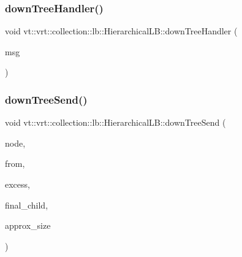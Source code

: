 \mbox{\label{structvt_1_1vrt_1_1collection_1_1lb_1_1_hierarchical_l_b_aa5e027cba0dfc9a1c7bc710e9932647a}} 
\subsubsection{\texorpdfstring{down\+Tree\+Handler()}{downTreeHandler()}}
{\footnotesize\ttfamily void vt\+::vrt\+::collection\+::lb\+::\+Hierarchical\+L\+B\+::down\+Tree\+Handler (\begin{DoxyParamCaption}\item[{\hyperlink{structvt_1_1vrt_1_1collection_1_1lb_1_1_l_b_tree_down_msg}{L\+B\+Tree\+Down\+Msg} $\ast$}]{msg }\end{DoxyParamCaption})\hspace{0.3cm}{\ttfamily [private]}}

\mbox{\label{structvt_1_1vrt_1_1collection_1_1lb_1_1_hierarchical_l_b_aff832357cbb81dc17578c9f8876b7ecf}} 
\subsubsection{\texorpdfstring{down\+Tree\+Send()}{downTreeSend()}}
{\footnotesize\ttfamily void vt\+::vrt\+::collection\+::lb\+::\+Hierarchical\+L\+B\+::down\+Tree\+Send (\begin{DoxyParamCaption}\item[{\hyperlink{namespacevt_a866da9d0efc19c0a1ce79e9e492f47e2}{Node\+Type} const}]{node,  }\item[{\hyperlink{namespacevt_a866da9d0efc19c0a1ce79e9e492f47e2}{Node\+Type} const}]{from,  }\item[{\hyperlink{structvt_1_1vrt_1_1collection_1_1lb_1_1_load_sampler_base_l_b_a8d939a849ec0d6371c1c4d441ffb9b94}{Obj\+Sample\+Type} const \&}]{excess,  }\item[{bool const}]{final\+\_\+child,  }\item[{std\+::size\+\_\+t const \&}]{approx\+\_\+size }\end{DoxyParamCaption})\hspace{0.3cm}{\ttfamily [private]}}

